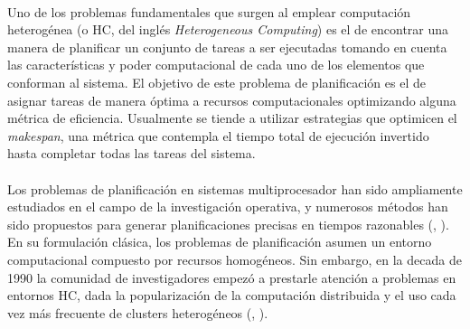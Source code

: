 \paragraph{}Uno de los problemas fundamentales que surgen al emplear computación heterogénea (o HC, del inglés \textit{Heterogeneous Computing}) es el de encontrar una manera de planificar un conjunto de tareas a ser ejecutadas tomando en cuenta las características y poder computacional de cada uno de los elementos que conforman al sistema. El objetivo de este problema de planificación es el de asignar tareas de manera óptima a recursos computacionales optimizando alguna métrica de eficiencia. Usualmente se tiende a utilizar estrategias que optimicen el \textit{makespan}, una métrica que contempla el tiempo total de ejecución invertido hasta completar todas las tareas del sistema.

\paragraph{}Los problemas de planificación en sistemas multiprocesador han sido ampliamente estudiados en el campo de la investigación operativa, y numerosos métodos han sido propuestos para generar planificaciones precisas en tiempos razonables (\citet{bib-rewini-scheduling}, \citet{bib-leung-handbook}). En su formulación clásica, los problemas de planificación asumen un entorno computacional compuesto por recursos homogéneos. Sin embargo, en la decada de 1990 la comunidad de investigadores empezó a prestarle atención a problemas en entornos HC, dada la popularización de la computación distribuida y el uso cada vez más frecuente de clusters heterogéneos (\citet{bib-freund}, \citet{bib-eshaghian-heterogeneous}).

